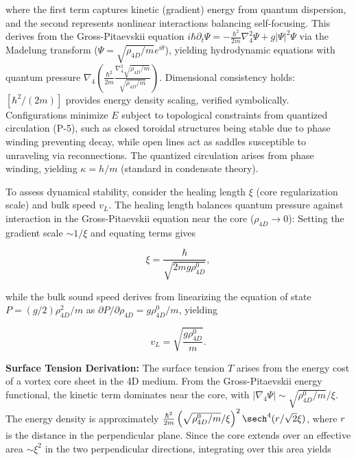 where the first term captures kinetic (gradient) energy from quantum dispersion, and the second represents nonlinear interactions balancing self-focusing. This derives from the Gross-Pitaevskii equation $i \hbar \partial_t \Psi = -\frac{\hbar^2}{2 m} \nabla_4^2 \Psi + g |\Psi|^2 \Psi$ via the Madelung transform ($\Psi = \sqrt{\rho_{4D}/m} e^{i \theta}$), yielding hydrodynamic equations with quantum pressure $\nabla_4 \left( \frac{\hbar^2}{2 m} \frac{\nabla_4^2 \sqrt{\rho_{4D}/m}}{\sqrt{\rho_{4D}/m}} \right)$. Dimensional consistency holds: $[\hbar^2 / (2m)]$ provides energy density scaling, verified symbolically. Configurations minimize $E$ subject to topological constraints from quantized circulation (P-5), such as closed toroidal structures being stable due to phase winding preventing decay, while open lines act as saddles susceptible to unraveling via reconnections. The quantized circulation arises from phase winding, yielding $\kappa = h / m$ (standard in condensate theory).

To assess dynamical stability, consider the healing length $\xi$ (core regularization scale) and bulk speed $v_L$. The healing length balances quantum pressure against interaction in the Gross-Pitaevskii equation near the core ($\rho_{4D} \to 0$): Setting the gradient scale $\sim 1/\xi$ and equating terms gives

\begin{equation}
\xi = \frac{\hbar}{\sqrt{2 m g \rho_{4D}^0}},
\end{equation}

while the bulk sound speed derives from linearizing the equation of state $P = (g/2) \rho_{4D}^2 / m$ as $\partial P / \partial \rho_{4D} = g \rho_{4D}^0 / m$, yielding

\begin{equation}
v_L = \sqrt{\frac{g \rho_{4D}^0}{m}}.
\end{equation}

\textbf{Surface Tension Derivation:} The surface tension $T$ arises from the energy cost of a vortex core sheet in the 4D medium. From the Gross-Pitaevskii energy functional, the kinetic term dominates near the core, with $|\nabla_4 \Psi| \sim \sqrt{\rho_{4D}^0 / m} / \xi$. The energy density is approximately $\frac{\hbar^2}{2m} \left( \sqrt{\rho_{4D}^0 / m} / \xi \right)^2 \sech^4(r / \sqrt{2} \xi)$, where $r$ is the distance in the perpendicular plane. Since the core extends over an effective area $\sim \xi^2$ in the two perpendicular directions, integrating over this area yields

